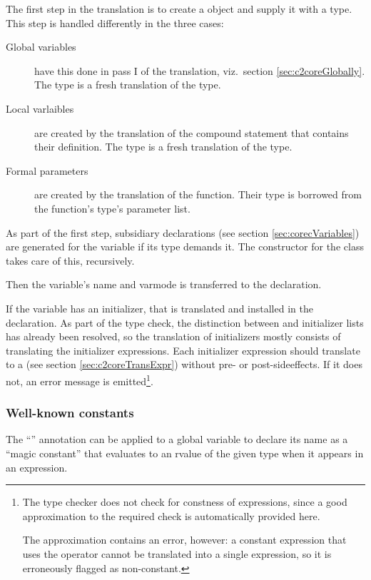 \begin{docpart}
The first step in the translation is to create a 
object and supply it with a type. This step is handled differently
in the three cases:
\begin{description}
\item[Global variables] have this done in pass I of the translation,
        viz.\ section \ref{sec:c2coreGlobally}. The type is a fresh
        translation of the \ansiC type.
\item[Local varlaibles] are created by the translation of the
        compound statement that contains their definition. The type
        is a fresh translation of the \ansiC type.
\item[Formal parameters] are created by the translation of the
        function. Their type is borrowed from the function's type's
        parameter list.
\end{description}
As part of the first step, subsidiary declarations (see section
\vref{sec:corecVariables}) are generated for the variable if its
type demands it. The constructor for the  class takes
care of this, recursively.

Then the variable's name and varmode is transferred to the \coreC
declaration.

If the variable has an initializer, that is translated and
installed in the \coreC declaration. As part of the type check,
the distinction between  and 
initializer lists has already been resolved, so the translation
of initializers mostly consists of translating the initializer
expressions. Each initializer expression should translate to a
 (see section \vref{sec:c2coreTransExpr})
without pre- or post-sideeffects. If it does not, an error message
is emitted\footnote
        {The type checker does not check for constness of expressions,
        since a good approximation to the required check is
        automatically provided here.

        The approximation contains an error, however: a constant
        expression that uses the  operator cannot be
        translated into a single \coreC expression, so it is
        erroneously flagged as non-constant.}.

\subsubsection{Well-known constants}
\label{sec:c2coreWellKnownConst}
The ``'' annotation can be applied to
a global variable to declare its name as a ``magic constant'' that
evaluates to an rvalue of the given type when it appears in an
expression.


\end{docpart}
